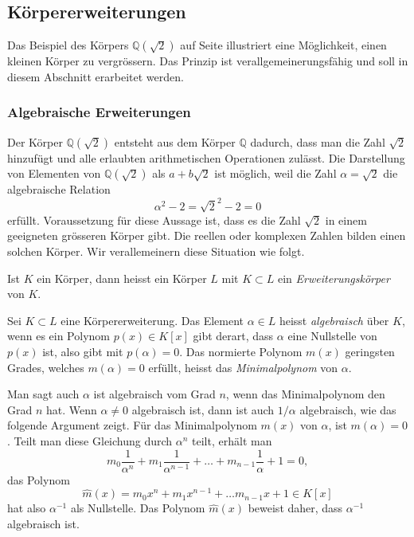 %
%
%
\subsection{Körpererweiterungen
\label{buch:integral:subsection:koerpererweiterungen}}
Das Beispiel des Körpers $\mathbb{Q}(\!\sqrt{2})$ auf Seite
\pageref{buch:integral:beispiel:Qsqrt2} illustriert eine Möglichkeit,
einen kleinen Körper zu vergrössern.
Das Prinzip ist verallgemeinerungsfähig und soll in diesem Abschnitt
erarbeitet werden.

%
\subsubsection{Algebraische Erweiterungen}
Der Körper $\mathbb{Q}(\!\sqrt{2})$ entsteht aus dem Körper $\mathbb{Q}$
dadurch, dass man die Zahl $\sqrt{2}$ hinzufügt und alle erlaubten
arithmetischen Operationen zulässt.
Die Darstellung von Elementen von $\mathbb{Q}(\!\sqrt{2})$ als
$a+b\sqrt{2}$ ist möglich, weil die Zahl $\alpha=\sqrt{2}$ die 
algebraische Relation
\[
\alpha^2-2 = \sqrt{2}^2 -2 = 0
\]
erfüllt.
Voraussetzung für diese Aussage ist, dass es die Zahl $\sqrt{2}$ in einem
geeigneten grösseren Körper gibt. 
Die reellen oder komplexen Zahlen bilden einen solchen Körper.
Wir verallemeinern diese Situation wie folgt.

\begin{definition}
Ist $K$ ein Körper, dann heisst ein Körper $L$ mit $K\subset L$ ein
{\em Erweiterungskörper} von $K$.
\end{definition}

\begin{definition}
\label{buch:integral:definition:algebraisch}
Sei $K\subset L$ eine Körpererweiterung.
Das Element $\alpha\in L$ heisst {\em algebraisch} über $K$, wenn es
ein Polynom $p(x)\in K[x]$ gibt derart, dass $\alpha$ eine Nullstelle
von $p(x)$ ist, also gibt mit $p(\alpha)=0$.
Das normierte Polynom $m(x)$ geringsten Grades, welches $m(\alpha)=0$
erfüllt, heisst das {\em Minimalpolynom} von $\alpha$.
%
\end{definition}

Man sagt auch $\alpha$ ist algebraisch vom Grad $n$, wenn das Minimalpolynom
den Grad $n$ hat.
Wenn $\alpha\ne 0$ algebraisch ist, dann ist auch $1/\alpha$ algebraisch,
wie das folgende Argument zeigt.
Für das Minimalpolynom $m(x)$ von $\alpha$, ist $m(\alpha)=0$.
Teilt man diese Gleichung durch $\alpha^n$ teilt, erhält man 
\[
m_0\frac{1}{\alpha^n}
+
m_1\frac{1}{\alpha^{n-1}}
+
\ldots
+
m_{n-1}\frac{1}{\alpha}
+
1
=
0,
\]
das Polynom
\[
\hat{m}(x)
=
m_0x^n + m_1x^{n-1} + \ldots m_{n-1} x + 1
\in
K[x]
\]
hat also $\alpha^{-1}$ als Nullstelle.
Das Polynom $\hat{m}(x)$ beweist daher, dass $\alpha^{-1}$ algebraisch ist.

